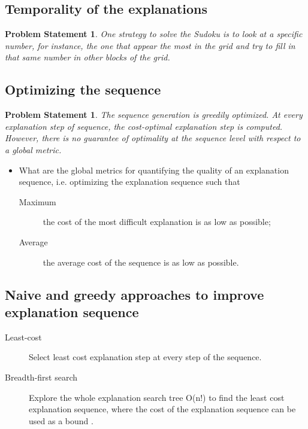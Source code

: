 \documentclass[a4paper,UKenglish,cleveref, autoref, thm-restate]{lipics-v2021}
\newtheorem{problem}[prob]{Problem Statement}
\begin{document}
\subsection{Temporality of the explanations} 
\begin{problem}\label{problem-statement:locality-explanations}
	One strategy to solve the Sudoku is to look at a specific number, for instance, the one that appear the most in the grid and try to fill in that same number in other blocks of the grid.
\end{problem}


\subsection{Optimizing the sequence}
\begin{problem}\label{problem-statement:sequence-optimisation}
	The sequence generation is greedily optimized.	At every explanation step of sequence, the cost-optimal explanation step is computed. However, there is \emph{no guarantee of optimality at the sequence level} with respect to a global metric.
\end{problem}

\begin{itemize}
	\item[Q1] What are the global metrics for quantifying the quality of an explanation sequence, i.e. optimizing the explanation sequence such that
	\begin{description}
		\item[Maximum] the cost of the most difficult explanation is as low as possible;
		\item[Average]  the average cost of the sequence is as low as possible.
	\end{description}	
\end{itemize}	


\subsection*{Naive and greedy approaches to improve explanation sequence}

\begin{description}
	\item[Least-cost] Select least cost explanation step at every step of the sequence.
	\item[Breadth-first search] Explore the whole explanation search tree O(n!) to find the least cost explanation sequence, where the cost of the explanation sequence can be used as a bound .
\end{description}
\end{document}

